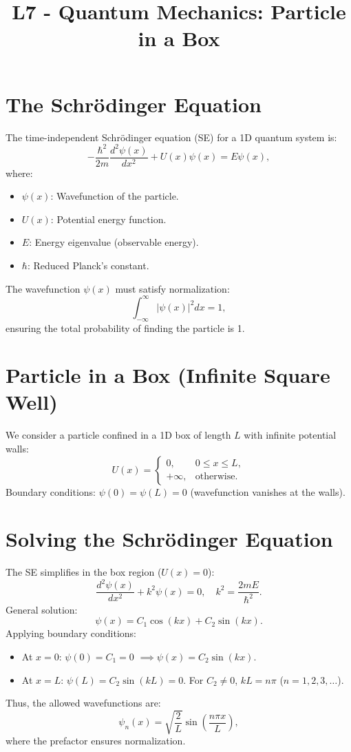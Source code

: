\documentclass[a4paper,12pt]{article}
\begin{document}
\title{L7 - Quantum Mechanics: Particle in a Box}
\author{}
\date{}
\maketitle
\begin{multicols}{2}

\section*{The Schrödinger Equation}
The time-independent Schrödinger equation (SE) for a 1D quantum system is:
\[
-\frac{\hbar^2}{2m} \frac{d^2\psi(x)}{dx^2} + U(x)\psi(x) = E\psi(x),
\]
where:
\begin{itemize}
    \item $\psi(x)$: Wavefunction of the particle.
    \item $U(x)$: Potential energy function.
    \item $E$: Energy eigenvalue (observable energy).
    \item $\hbar$: Reduced Planck's constant.
\end{itemize}
The wavefunction $\psi(x)$ must satisfy normalization:
\[
\int_{-\infty}^\infty |\psi(x)|^2 dx = 1,
\]
ensuring the total probability of finding the particle is 1.

\section*{Particle in a Box (Infinite Square Well)}
We consider a particle confined in a 1D box of length $L$ with infinite potential walls:
\[
U(x) = 
\begin{cases} 
0, & 0 \leq x \leq L, \\
+\infty, & \text{otherwise}.
\end{cases}
\]
Boundary conditions: $\psi(0) = \psi(L) = 0$ (wavefunction vanishes at the walls).

\section*{Solving the Schrödinger Equation}
The SE simplifies in the box region ($U(x) = 0$):
\[
\frac{d^2\psi(x)}{dx^2} + k^2\psi(x) = 0, \quad k^2 = \frac{2mE}{\hbar^2}.
\]
General solution:
\[
\psi(x) = C_1 \cos(kx) + C_2 \sin(kx).
\]
Applying boundary conditions:
\begin{itemize}
    \item At $x=0$: $\psi(0) = C_1 = 0$ $\implies \psi(x) = C_2 \sin(kx)$.
    \item At $x=L$: $\psi(L) = C_2 \sin(kL) = 0$. For $C_2 \neq 0$, $kL = n\pi$ ($n = 1, 2, 3, \dots$).
\end{itemize}
Thus, the allowed wavefunctions are:
\[
\psi_n(x) = \sqrt{\frac{2}{L}} \sin\left(\frac{n\pi x}{L}\right),
\]
where the prefactor ensures normalization.


\end{multicols}
\end{document}

